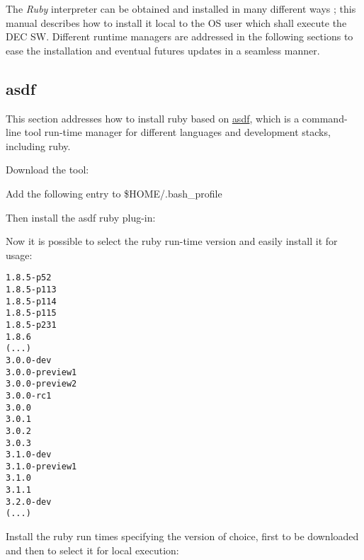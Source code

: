 \documentclass[dec_sum_main.tex]{subfiles}
\begin{document}
\par
\noindent 
The \textit{Ruby} interpreter can be obtained and installed in many different ways ; this manual describes how to install it local to the OS user which shall execute the DEC SW. Different runtime managers are addressed in the following sections to ease the installation and eventual futures updates in a seamless manner.

\subsection{asdf}
\par
\noindent
This section addresses how to install ruby based on \href{https://asdf-vm.com/guide/getting-started.html#_1-install-dependencies}{asdf}, which is a command-line tool run-time manager for different languages and development stacks, including ruby.\newline

\par
\noindent
Download the tool:

  \newline

Add the following entry to \$HOME/.bash\_profile 

  \newline


\par
\noindent
Then install the asdf ruby plug-in:

 \newline

\par
\noindent
Now it is possible to select the ruby run-time version and easily install it for usage:\newline


\begin{Verbatim}
1.8.5-p52
1.8.5-p113
1.8.5-p114
1.8.5-p115
1.8.5-p231
1.8.6
(...)
3.0.0-dev
3.0.0-preview1
3.0.0-preview2
3.0.0-rc1
3.0.0
3.0.1
3.0.2
3.0.3
3.1.0-dev
3.1.0-preview1
3.1.0
3.1.1
3.2.0-dev
(...)
\end{Verbatim}


\par
\noindent
Install the ruby run times specifying the version of choice, first to be downloaded and then to select it for local execution:\newline
\end{document}
